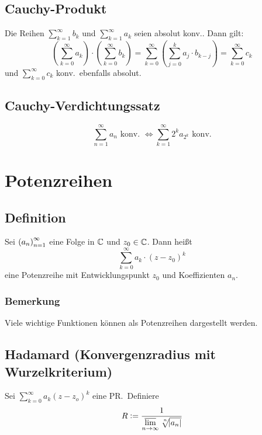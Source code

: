 \subsection{Cauchy-Produkt}
Die Reihen  $\sum_{k=1}^\infty b_k$ und $\sum_{k=1}^\infty a_k$ seien absolut
konv.. Dann gilt:
\begin{equation*}
    \left(\sum_{k=0}^\infty a_k\right) \cdot \left(\sum_{k=0}^\infty b_k\right) =
    \sum_{k=0}^\infty \left(\sum_{j=0}^k a_j \cdot b_{k-j}\right) =
    \sum_{k=0}^\infty c_k
\end{equation*}
und $\sum_{k=0}^\infty c_k$ konv.\ ebenfalls absolut.

\subsection{Cauchy-Verdichtungssatz}
\begin{equation*}
    \sum_{n=1}^\infty a_n \text{ konv. } \Leftrightarrow
    \sum_{k=1}^\infty 2^k a_{2^k} \text{ konv.}
\end{equation*}


\section{Potenzreihen}

\subsection{Definition}
Sei ${(a_n)}_{n=1}^\infty$ eine Folge in $\mathbb{C}$ und $z_0 \in \mathbb{C}$. Dann heißt
\begin{equation*}
    \sum_{k=0}^\infty a_k \cdot {(z - z_0)}^k
\end{equation*}
eine Potenzreihe mit Entwicklungspunkt $z_0$ und Koeffizienten
$a_n$.

\subsubsection{Bemerkung} Viele wichtige Funktionen können als Potenzreihen dargestellt
werden.

\subsection{Hadamard (Konvergenzradius mit Wurzelkriterium)}
Sei $\sum_{k=0}^\infty a_k {(z-z_o)}^k$ eine PR.\ Definiere
\begin{equation*}
    R := \frac{1}{\varlimsup\limits_{n \rightarrow \infty} \nthSqrt{n}{\abs{a_n}}}
\end{equation*}

